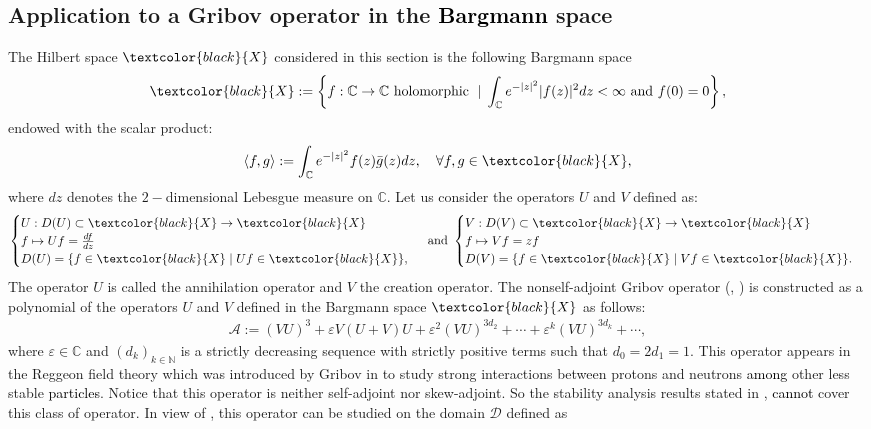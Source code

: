 \documentclass[11pt, dvipsnames]{amsart}
\begin{document}
\subsection{Application to a Gribov operator in the \textcolor{black}{Bargmann} space}
The Hilbert space $\textcolor{black}{X}$ considered in this section is the following Bargmann space
\begin{equation*}
    \textcolor{black}{X}:=\left\{f:\mathbb{C}\rightarrow \mathbb{C}\ \text{holomorphic}\ \;|\;\int_{\mathbb{C}}e^{-|z|^2}|f(z)|^2dz<\infty \ \text{and}\ f(0)=0\right\},
\end{equation*} endowed with the scalar product:
\begin{align*}
    \langle f,g\rangle:=\int_{\mathbb{C}}e^{-|z|^2}f(z)\bar g(z)dz,\quad \forall f,g\in \textcolor{black}{X},
\end{align*} 
where $dz$ denotes the $2-$dimensional Lebesgue measure on $\mathbb{C}.$
Let us consider the operators $U$ and $V$ defined as:
\begin{align*}
    \begin{cases}
        U: D(U)\subset \textcolor{black}{X}\rightarrow \textcolor{black}{X}\\
        f\mapsto Uf=\frac{df}{dz}\\
        D(U)=\{f\in \textcolor{black}{X} \;|\; Uf\in \textcolor{black}{X}\},
    \end{cases}\ \text{and}\ \begin{cases}
        V: D(V)\subset \textcolor{black}{X}\rightarrow \textcolor{black}{X}\\
        f\mapsto Vf=zf\\
        D(V)=\{f\in \textcolor{black}{X} \;|\; Vf\in \textcolor{black}{X}\}.
    \end{cases}
\end{align*}
The operator $U$ is called the annihilation operator and $V$ the creation operator. The nonself-adjoint Gribov operator (\cite{Aimar1999-On-an-unconditional}, \cite{Intissar1997-analyse}) is constructed as a polynomial of the operators $U$ and $V$ defined in the Bargmann space $\textcolor{black}{X}$ as follows:
\begin{align}
\mathcal{A}:=(VU)^3+\varepsilon V(U+V)U+\varepsilon^2(VU)^{3d_2}+\cdots+\varepsilon^k(VU)^{3d_k}+\cdots, \label{Gribov-operator}
\end{align}  where $\varepsilon\in \mathbb{C}$ and $(d_k)_{k\in\mathbb{N}}$ is a strictly decreasing sequence with strictly positive terms such that $d_0=2d_1=1.$ This operator appears in the Reggeon field theory which was introduced by Gribov in \cite{Gribov1968-A-reggeon} to study strong interactions between protons and neutrons \textcolor{black}{among} other less stable \textcolor{black}{particles}. Notice that this operator is neither self-adjoint nor skew-adjoint. So the stability analysis results stated in \cite{Gagnon2022-fredholm}, \cite{Gagnon2022-fredholm-laplacien} \textcolor{black}{cannot} cover this class of operator. In view of \cite{Feki2014-riesz}, this operator can be studied on the domain $\mathcal{D}$ defined as
\end{document}

